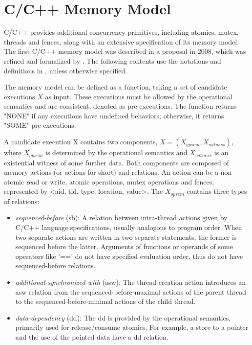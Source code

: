 \section{C/C++ Memory Model}
C/C++ provides additional concurrency primitives, including atomics, mutex, threads and fences, along with an extensive specification of its memory model.
The first C/C++ memory model was described in a proposal\cite{c++model-proposal} in 2008, which was refined and formalized by \cite{c++model}. The following contents use the notations and definitions in \cite{c++model}, unless otherwise specified.

The memory model can be defined as a function, taking a set of candidate executions $X$ as input. These executions must be allowed by the operational semantics and are consistent, denoted as pre-executions. The function returns "NONE" if any executions have undefined behaviors; otherwise, it returns "SOME" pre-executions.

A candidate execution X contains two components, $X = (X_{opsem}, X_{witness})$, where $X_{opsem}$ is determined by the operational semantics and $X_{witness}$ is an existential witness of some further data. Both components are composed of memory actions (or actions for short) and relations. An action can be a non-atomic read or write, atomic operations, mutex operations and fences, represented by <aid, tid, type, location, value>. The $X_{opsem}$ contains three types of relations:

\begin{itemize}
	\item \textit{sequenced-before} (sb): A relation between intra-thread actions given by C/C++ language specifications, usually analogous to program order. When two separate actions are written in two separate statements, the former is sequenced before the latter. Arguments of functions or operands of some operators like '==' do not have specified evaluation order, thus do not have sequenced-before relations.
	\item \textit{additional-synchronized-with} (asw): The thread-creation action introduces an asw relation from the sequenced-before-maximal actions of the parent thread to the sequenced-before-minimal actions of the child thread.
	\item \textit{data-dependency} (dd):  The dd is provided by the operational semantics, primarily used for release/consume atomics. For example, a store to a pointer and the use of the pointed data have a dd relation.
\end{itemize}


